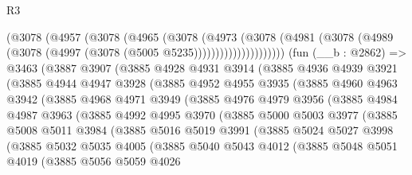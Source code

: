 \begin{lexlean}{R3}
\begin{coremodule}
                  (@3078
                    (@4957
                      (@3078
                        (@4965
                          (@3078
                            (@4973
                              (@3078
                                (@4981
                                  (@3078
                                    (@4989 (@3078 (@4997 (@3078 (@5005 @5235)))))))))))))))))))))
    (fun (__b : @2862) =>
    @3463
      (@3887
        @3907
        (@3885
          @4928
          @4931
          @3914
          (@3885
            @4936
            @4939
            @3921
            (@3885
              @4944
              @4947
              @3928
              (@3885
                @4952
                @4955
                @3935
                (@3885
                  @4960
                  @4963
                  @3942
                  (@3885
                    @4968
                    @4971
                    @3949
                    (@3885
                      @4976
                      @4979
                      @3956
                      (@3885
                        @4984
                        @4987
                        @3963
                        (@3885
                          @4992
                          @4995
                          @3970
                          (@3885
                            @5000
                            @5003
                            @3977
                            (@3885
                              @5008
                              @5011
                              @3984
                              (@3885
                                @5016
                                @5019
                                @3991
                                (@3885
                                  @5024
                                  @5027
                                  @3998
                                  (@3885
                                    @5032
                                    @5035
                                    @4005
                                    (@3885
                                      @5040
                                      @5043
                                      @4012
                                      (@3885
                                        @5048
                                        @5051
                                        @4019
                                        (@3885
                                          @5056
                                          @5059
                                          @4026

\end{coremodule}
\end{lexlean}
